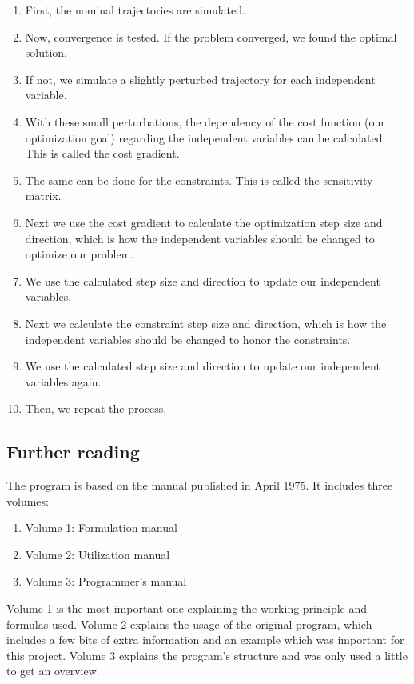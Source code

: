 \begin{enumerate}
  \def\labelenumi{\arabic{enumi}.}
  \item First, the nominal trajectories are simulated.
  \item Now, convergence is tested. If the problem converged, we found the
        optimal solution.
  \item If not, we simulate a slightly perturbed trajectory for each independent
        variable.
  \item With these small perturbations, the dependency of the cost function (our
        optimization goal) regarding the independent variables can be calculated. This
        is called the cost gradient.
  \item The same can be done for the constraints. This is called the sensitivity
        matrix.
  \item Next we use the cost gradient to calculate the optimization step size and
        direction, which is how the independent variables should be changed to
        optimize our problem.
  \item We use the calculated step size and direction to update our independent
        variables.
  \item Next we calculate the constraint step size and direction, which is how
        the independent variables should be changed to honor the constraints.
  \item We use the calculated step size and direction to update our independent
        variables again.
  \item Then, we repeat the process.
\end{enumerate}

\subsection{Further reading}\label{further-reading}

The program is based on the manual published in April 1975. It includes three
volumes:
\begin{enumerate}
  \item Volume 1: Formulation manual\cite{PostFormulation}
  \item Volume 2: Utilization manual\cite{PostUtilization}
  \item Volume 3: Programmer's manual\cite{PostProgrammers}
\end{enumerate}

Volume 1 is the most important one explaining the working principle and
formulas used. Volume 2 explains the usage of the original program, which
includes a few bits of extra information and an example which was important
for this project. Volume 3 explains the program's structure and was only used
a little to get an overview.

